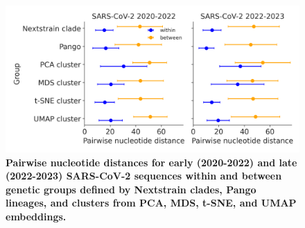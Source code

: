\begin{figure}[!h]
\includegraphics[width=\columnwidth]{figures/within_between_sars.png}
\caption{{\bf Pairwise nucleotide distances for early (2020-2022) and late (2022-2023) SARS-CoV-2 sequences within and between genetic groups defined by Nextstrain clades, Pango lineages, and clusters from PCA, MDS, t-SNE, and UMAP embeddings.}}\label{S_Fig_sarscov2_within_between_group_distances}
\end{figure}

